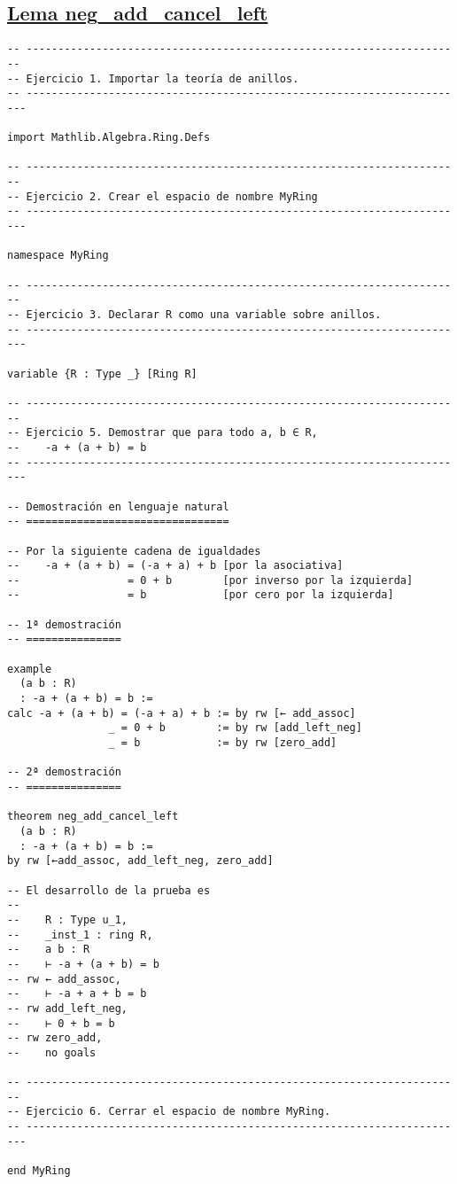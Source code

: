 \subsection{\href{./src/Basicos/neg\_add\_cancel\_left.lean}{Lema neg\_add\_cancel\_left}}
\label{sec:org5844dd2}
\begin{verbatim}
-- ---------------------------------------------------------------------
-- Ejercicio 1. Importar la teoría de anillos.
-- ----------------------------------------------------------------------

import Mathlib.Algebra.Ring.Defs

-- ---------------------------------------------------------------------
-- Ejercicio 2. Crear el espacio de nombre MyRing
-- ----------------------------------------------------------------------

namespace MyRing

-- ---------------------------------------------------------------------
-- Ejercicio 3. Declarar R como una variable sobre anillos.
-- ----------------------------------------------------------------------

variable {R : Type _} [Ring R]

-- ---------------------------------------------------------------------
-- Ejercicio 5. Demostrar que para todo a, b ∈ R,
--    -a + (a + b) = b
-- ----------------------------------------------------------------------

-- Demostración en lenguaje natural
-- ================================

-- Por la siguiente cadena de igualdades
--    -a + (a + b) = (-a + a) + b [por la asociativa]
--                 = 0 + b        [por inverso por la izquierda]
--                 = b            [por cero por la izquierda]

-- 1ª demostración
-- ===============

example
  (a b : R)
  : -a + (a + b) = b :=
calc -a + (a + b) = (-a + a) + b := by rw [← add_assoc]
                _ = 0 + b        := by rw [add_left_neg]
                _ = b            := by rw [zero_add]

-- 2ª demostración
-- ===============

theorem neg_add_cancel_left
  (a b : R)
  : -a + (a + b) = b :=
by rw [←add_assoc, add_left_neg, zero_add]

-- El desarrollo de la prueba es
--
--    R : Type u_1,
--    _inst_1 : ring R,
--    a b : R
--    ⊢ -a + (a + b) = b
-- rw ← add_assoc,
--    ⊢ -a + a + b = b
-- rw add_left_neg,
--    ⊢ 0 + b = b
-- rw zero_add,
--    no goals

-- ---------------------------------------------------------------------
-- Ejercicio 6. Cerrar el espacio de nombre MyRing.
-- ----------------------------------------------------------------------

end MyRing
\end{verbatim}

